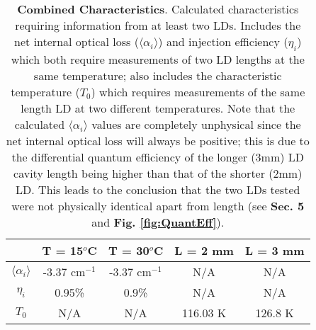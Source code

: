 \documentclass[9pt,twocolumn,twoside]{osajnl}
\begin{document}
\begin{table}[H]
\centering
\begin{tabular}{|c |c|c|c| c|}
\hline
 & T = 15$^o$C & T = 30$^o$C & L = 2 mm & L = 3 mm \\
\hline\hline
$\langle \alpha_i \rangle$ & -3.37 cm$^{-1}$  & -3.37 cm$^{-1}$ & N/A & N/A \\
\hline
$\eta_i$ & 0.95\% & 0.9\% & N/A & N/A\\
\hline
$T_0$ & N/A & N/A & 116.03 K & 126.8 K \\
\hline
\end{tabular}
\centering
\caption{\textbf{Combined Characteristics}. Calculated characteristics requiring information from at least two LDs. Includes the net internal optical loss ($\langle \alpha_i \rangle$) and injection efficiency ($\eta_i$) which both require measurements of two LD lengths at the same temperature; also includes the characteristic temperature ($T_0$) which requires measurements of the same length LD at two different temperatures. Note that the calculated $\langle \alpha_i \rangle$ values are completely unphysical since the net internal optical loss will always be positive; this is due to the differential quantum efficiency of the longer (3mm) LD cavity length being higher than that of the shorter (2mm) LD. This leads to the conclusion that the two LDs tested were not physically identical apart from length (see \textbf{Sec. 5} and \textbf{Fig. \ref{fig:QuantEff}}).}
\label{tab:Characteristics2}
\end{table}
\end{document}
